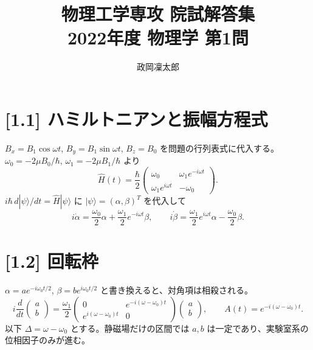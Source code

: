 \documentclass[11pt,a4paper]{article}
\title{物理工学専攻 院試解答集\\2022年度 物理学 第1問}
\author{政岡凜太郎}
\date{}
\begin{document}
\maketitle

\section*{[1.1] ハミルトニアンと振幅方程式}
$B_x=B_1\cos\omega t$, $B_y=B_1\sin\omega t$, $B_z=B_0$ を問題の行列表式に代入する。$\omega_0=-2\mu B_0/\hbar$, $\omega_1=-2\mu B_1/\hbar$ より
\[
\hat H(t)=\frac{\hbar}{2}
\begin{pmatrix}\omega_0&\omega_1e^{-i\omega t}\\
\omega_1e^{i\omega t}&-\omega_0\end{pmatrix}.
\]
$i\hbar\,d|\psi\rangle/dt=\hat H|\psi\rangle$ に $|\psi\rangle=(\alpha,\beta)^T$ を代入して
\[
i\dot\alpha=\frac{\omega_0}{2}\alpha+\frac{\omega_1}{2}e^{-i\omega t}\beta,
\qquad i\dot\beta=\frac{\omega_1}{2}e^{i\omega t}\alpha-\frac{\omega_0}{2}\beta.
\]

\section*{[1.2] 回転枠}
$\alpha=a e^{-i\omega_0t/2}$, $\beta=b e^{i\omega_0t/2}$ と書き換えると、対角項は相殺される。
\[
i\frac{d}{dt}\begin{pmatrix}a\\b\end{pmatrix}
=\frac{\omega_1}{2}\begin{pmatrix}0&e^{-i(\omega-\omega_0)t}\\
e^{i(\omega-\omega_0)t}&0\end{pmatrix}\begin{pmatrix}a\\b\end{pmatrix},
\qquad \boxed{A(t)=e^{-i(\omega-\omega_0)t}}.
\]
以下 $\Delta=\omega-\omega_0$ とする。静磁場だけの区間では $a,b$ は一定であり、実験室系の位相因子のみが進む。
\end{document}
